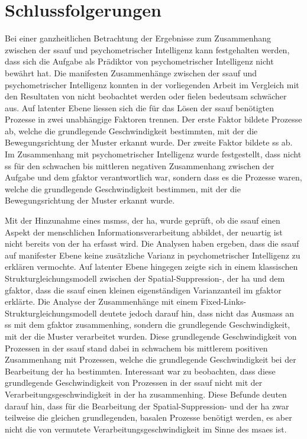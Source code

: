 \documentclass[11pt, twoside, a4paper]{book}		%
\begin{document}
\section{Schlussfolgerungen}

Bei einer ganzheitlichen Betrachtung der Ergebnisse zum Zusammenhang zwischen der \gls{ssauf} und psychometrischer Intelligenz kann festgehalten werden, dass sich die Aufgabe als Prädiktor von psychometrischer Intelligenz nicht bewährt hat. Die manifesten Zusammenhänge zwischen der \gls{ssauf} und psychometrischer Intelligenz konnten in der vorliegenden Arbeit im Vergleich mit den Resultaten von \citet{Melnick2013} nicht beobachtet werden oder fielen bedeutsam schwächer aus.
Auf latenter Ebene liessen sich die für das Lösen der \gls{ssauf} benötigten Prozesse in zwei unabhängige Faktoren trennen.
Der erste Faktor bildete Prozesse ab, welche die grundlegende Geschwindigkeit bestimmten, mit der die Bewegungsrichtung der Muster erkannt wurde. Der zweite Faktor bildete \gls{ss} ab. Im Zusammenhang mit psychometrischer Intelligenz wurde festgestellt, dass nicht \gls{ss} für den schwachen bis mittleren negativen Zusammenhang zwischen der Aufgabe und dem \gls{gfaktor} verantwortlich war, sondern dass es die Prozesse waren, welche die grundlegende Geschwindigkeit bestimmen, mit der die Bewegungsrichtung der Muster erkannt wurde.

Mit der Hinzunahme eines \glspl{msm}s, der \gls{ha}, wurde geprüft, ob die \gls{ssauf} einen Aspekt der menschlichen Informationsverarbeitung abbildet, der neuartig ist nicht bereits von der \gls{ha} erfasst wird. Die Analysen haben ergeben, dass die \gls{ssauf} auf manifester Ebene keine zusätzliche Varianz in psychometrischer Intelligenz zu erklären vermochte. 
Auf latenter Ebene hingegen zeigte sich in einem klassischen Strukturgleichungsmodell zwischen der \mbox{Spatial-Suppression-,} der \gls{ha} und dem \gls{gfaktor}, dass die \gls{ssauf} einen kleinen eigenständigen Varianzanteil im \gls{gfaktor} erklärte.
Die Analyse der Zusammenhänge mit einem Fixed-Links-Struk\-tur\-glei\-chungs\-mo\-dell deutete jedoch darauf hin, dass nicht das Ausmass an \gls{ss} mit dem \gls{gfaktor} zusammenhing, sondern die grundlegende Geschwindigkeit, mit der die Muster verarbeitet wurden.
Diese grundlegende Geschwindigkeit von Prozessen in der \gls{ssauf} stand dabei in schwachem bis mittlerem positiven Zusammenhang mit Prozessen, welche die grundlegende Geschwindigkeit bei der Bearbeitung der \gls{ha} bestimmten. Interessant war zu beobachten, dass diese grundlegende Geschwindigkeit von Prozessen in der \gls{ssauf} nicht mit der Verarbeitungsgeschwindigkeit in der \gls{ha} zusammenhing. 
Diese Befunde deuten darauf hin, dass für die Bearbeitung der Spatial-Suppression- und der \gls{ha} zwar teilweise die gleichen grundlegenden, basalen Prozesse benötigt werden, es aber nicht die von \citet{Melnick2013} vermutete Verarbeitungsgeschwindigkeit im Sinne des \gls{msa}es \citep[z.~B.][]{Deary2000a, Jensen1982a, Jensen1982b, Jensen2006, Roth1964, Vernon1983} ist. 
\end{document}
